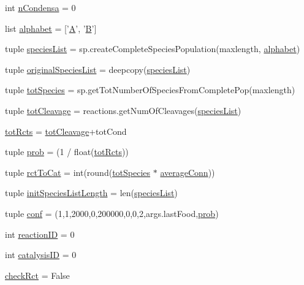 \begin{DoxyCompactItemize}
int \hyperlink{a00159_a38aa665f11207bbd8cd2da4c382d4aca}{n\+Condensa} = 0
\item 
list \hyperlink{a00159_ab0d9c13eee214bf78b20760bf2835248}{alphabet} = \mbox{[}'\hyperlink{a00111_ab4f8a2431d9ad6efec44b47971737c52}{A}', '\hyperlink{a00111_afb39b9efa52a33745c5e622fa358a97f}{B}'\mbox{]}
\item 
tuple \hyperlink{a00159_a5bfc4cfa78ac777159cb0ca9c9c5c2f6}{species\+List} = sp.\+create\+Complete\+Species\+Population(maxlength, \hyperlink{a00159_ab0d9c13eee214bf78b20760bf2835248}{alphabet})
\item 
tuple \hyperlink{a00159_a62b034cfe14eff36f09dd65a51ae7c9c}{original\+Species\+List} = deepcopy(\hyperlink{a00159_a5bfc4cfa78ac777159cb0ca9c9c5c2f6}{species\+List})
\item 
tuple \hyperlink{a00159_ac657414359bc072005d43b2328119a7d}{tot\+Species} = sp.\+get\+Tot\+Number\+Of\+Species\+From\+Complete\+Pop(maxlength)
\item 
tuple \hyperlink{a00159_a1e875e49e1f980d461a398fd6a072b0b}{tot\+Cleavage} = reactions.\+get\+Num\+Of\+Cleavages(\hyperlink{a00159_a5bfc4cfa78ac777159cb0ca9c9c5c2f6}{species\+List})
\item 
\hyperlink{a00159_a059c41eb160321f87ba469fddd20eda7}{tot\+Rcts} = \hyperlink{a00159_a1e875e49e1f980d461a398fd6a072b0b}{tot\+Cleavage}+tot\+Cond
\item 
tuple \hyperlink{a00159_aad2c05e3d2146196ed236911dd796f6e}{prob} = (1 / float(\hyperlink{a00159_a059c41eb160321f87ba469fddd20eda7}{tot\+Rcts}))
\item 
tuple \hyperlink{a00159_afa804d4b1d39a63de9f14e5ab379ae34}{rct\+To\+Cat} = int(round(\hyperlink{a00159_ac657414359bc072005d43b2328119a7d}{tot\+Species} $\ast$ \hyperlink{a00159_a0d59133b2bb42e7aa26a3dba3a2a9a70}{average\+Conn}))
\item 
tuple \hyperlink{a00159_af2370a811b14632a793a28e451be8150}{init\+Species\+List\+Length} = len(\hyperlink{a00159_a5bfc4cfa78ac777159cb0ca9c9c5c2f6}{species\+List})
\item 
tuple \hyperlink{a00159_aa468c4ff92202c7d89fb631e8cb54dc8}{conf} = (1,1,2000,0,200000,0,0,2,args.\+last\+Food,\hyperlink{a00159_aad2c05e3d2146196ed236911dd796f6e}{prob})
\item 
int \hyperlink{a00159_a07d632b487fabd051ab725ee95a85368}{reaction\+I\+D} = 0
\item 
int \hyperlink{a00159_a35953bf84aa0f7a2a3ffa3f68190c0fa}{catalysis\+I\+D} = 0
\item 
\hyperlink{a00159_a6f49caf3b9250cab918ae8dc5aef9931}{check\+Rct} = False

\end{DoxyCompactItemize}
